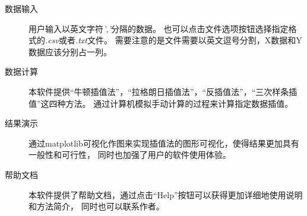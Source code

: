 \documentclass[UTF8]{ctexart}
\begin{document}
        \begin{description}
            \item[数据输入] 用户输入以英文字符\emph{','}分隔的数据。
            也可以点击文件选项按钮选择指定格式的\emph{.csv}或者\emph{.txt}文件。
            需要注意的是文件需要以英文逗号分割，X数据和Y数据应该分别占一列。 
            \item[数据计算] 本软件提供“牛顿插值法”，“拉格朗日插值法”，“反插值法”，“三次样条插值”这四种方法。
            通过计算机模拟手动计算的过程来计算指定数据插值。 
            \item[结果演示] 通过matplotlib可视化作图来实现插值法的图形可视化，使得结果更加具有一般性和可行性，
            同时也加强了用户的软件使用体验。 
            \item[帮助文档] 本软件提供了帮助文档，通过点击“Help”按钮可以获得更加详细地使用说明和方法简介，
            同时也可以联系作者。 
        \end{description}    
\end{document}
